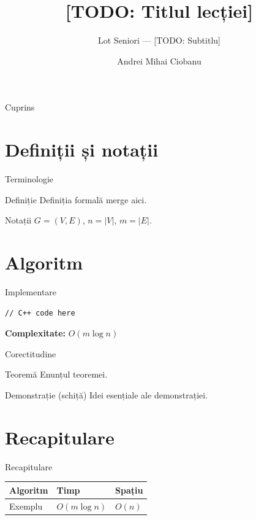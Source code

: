 \documentclass[10pt]{beamer}
\title{[TODO: Titlul lecției]}
\subtitle{Lot Seniori --- [TODO: Subtitlu]}
\author{Andrei Mihai Ciobanu}
\institute{Algolymp Summer School}
\date{}
\begin{document}
\begin{frame}
  \titlepage
\end{frame}

\begin{frame}{Cuprins}
  \tableofcontents
\end{frame}

\section{Definiții și notații}

\begin{frame}{Terminologie}
  \begin{block}{Definiție}
    Definiția formală merge aici.
  \end{block}
  \begin{block}{Notații}
    $G = (V, E)$, $n = |V|$, $m = |E|$.
  \end{block}
\end{frame}

\section{Algoritm}

\begin{frame}[fragile]{Implementare}
  \begin{lstlisting}
// C++ code here
  \end{lstlisting}
  \textbf{Complexitate:} $O(m \log n)$
\end{frame}

\begin{frame}{Corectitudine}
  \begin{block}{Teoremă}
    Enunțul teoremei.
  \end{block}
  \begin{alertblock}{Demonstrație (schiță)}
    Idei esențiale ale demonstrației.
  \end{alertblock}
\end{frame}

\section{Recapitulare}

\begin{frame}{Recapitulare}
  \begin{center}
  \begin{tabular}{lll}
    \toprule
    Algoritm & Timp & Spațiu \\
    \midrule
    Exemplu  & $O(m \log n)$ & $O(n)$ \\
    \bottomrule
  \end{tabular}
  \end{center}
\end{frame}
\end{document}
